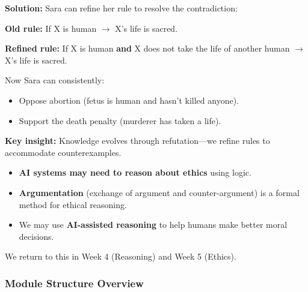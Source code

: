\begin{thmbox}
\textbf{Solution:} Sara can refine her rule to resolve the contradiction:

\textbf{Old rule:} If X is human $\to$ X's life is sacred.

\textbf{Refined rule:} If X is human \textbf{and} X does not take the life of another human $\to$ X's life is sacred.

Now Sara can consistently:
\begin{itemize}
  \item Oppose abortion (fetus is human and hasn't killed anyone).
  \item Support the death penalty (murderer has taken a life).
\end{itemize}

\textbf{Key insight:} Knowledge evolves through refutation---we refine rules to accommodate counterexamples.
\end{thmbox}

\begin{tipbox}[Relevance to AI]
\begin{itemize}
  \item \textbf{AI systems may need to reason about ethics} using logic.
  \item \textbf{Argumentation} (exchange of argument and counter-argument) is a formal method for ethical reasoning.
  \item We may use \textbf{AI-assisted reasoning} to help humans make better moral decisions.
\end{itemize}
We return to this in Week 4 (Reasoning) and Week 5 (Ethics).
\end{tipbox}

\bigseparator

\subsubsection{Module Structure Overview}

